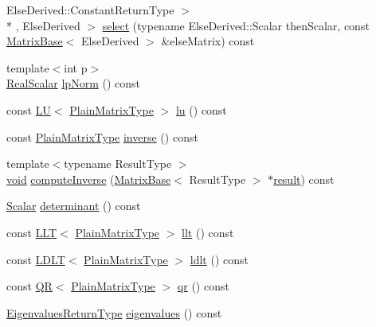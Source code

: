 \begin{DoxyCompactItemize}
Else\-Derived\-::\-Constant\-Return\-Type $>$\\*
, Else\-Derived $>$ \hyperlink{class_matrix_base_a16bf7ce4c4e617ebf4d1083160d44124}{select} (typename Else\-Derived\-::\-Scalar then\-Scalar, const \hyperlink{class_matrix_base}{Matrix\-Base}$<$ Else\-Derived $>$ \&else\-Matrix) const 
\item 
{\footnotesize template$<$int p$>$ }\\\hyperlink{class_matrix_base_a634804c67de40fec74e3640bc229364c}{Real\-Scalar} \hyperlink{class_matrix_base_a2baadc122bf78b1dae91a66d12ce255f}{lp\-Norm} () const 
\item 
const \hyperlink{class_l_u}{L\-U}$<$ \hyperlink{class_matrix_base_aa6a23b3d1aac2a1b4b9d8bcb54e1e2bc}{Plain\-Matrix\-Type} $>$ \hyperlink{class_matrix_base_a8ec83738a46f2a13e6d878726e289116}{lu} () const 
\item 
const \hyperlink{class_matrix_base_aa6a23b3d1aac2a1b4b9d8bcb54e1e2bc}{Plain\-Matrix\-Type} \hyperlink{class_matrix_base_a27c44883ab6a4828bcae0c8bf8c4a958}{inverse} () const 
\item 
{\footnotesize template$<$typename Result\-Type $>$ }\\\hyperlink{group___u_a_v_objects_plugin_ga444cf2ff3f0ecbe028adce838d373f5c}{void} \hyperlink{class_matrix_base_a6c2b95ebe2784c06eb8020918519b3e4}{compute\-Inverse} (\hyperlink{class_matrix_base}{Matrix\-Base}$<$ Result\-Type $>$ $\ast$\hyperlink{qxtslotjob_8h_aab161efab0511ea9612b64c40e9852ca}{result}) const 
\item 
\hyperlink{class_matrix_base_a625df8339dc2d816cbc0fd66e7dadaf5}{Scalar} \hyperlink{class_matrix_base_a575c602e776b302104919a8bf3094178}{determinant} () const 
\item 
const \hyperlink{class_l_l_t}{L\-L\-T}$<$ \hyperlink{class_matrix_base_aa6a23b3d1aac2a1b4b9d8bcb54e1e2bc}{Plain\-Matrix\-Type} $>$ \hyperlink{class_matrix_base_a0219ae58c2348bcfd963e80bd95b6ab5}{llt} () const 
\item 
const \hyperlink{class_l_d_l_t}{L\-D\-L\-T}$<$ \hyperlink{class_matrix_base_aa6a23b3d1aac2a1b4b9d8bcb54e1e2bc}{Plain\-Matrix\-Type} $>$ \hyperlink{class_matrix_base_ae796844a6225cfbc0de39450a791bbff}{ldlt} () const 
\item 
const \hyperlink{class_q_r}{Q\-R}$<$ \hyperlink{class_matrix_base_aa6a23b3d1aac2a1b4b9d8bcb54e1e2bc}{Plain\-Matrix\-Type} $>$ \hyperlink{class_matrix_base_af9393824bddc6f0782a846037719de48}{qr} () const 
\item 
\hyperlink{class_matrix_base_ab041ffd1da23ffd76ad673bd73426d38}{Eigenvalues\-Return\-Type} \hyperlink{class_matrix_base_a335e48e1808d344d8f23ab4cfc5a62b7}{eigenvalues} () const 

\end{DoxyCompactItemize}
